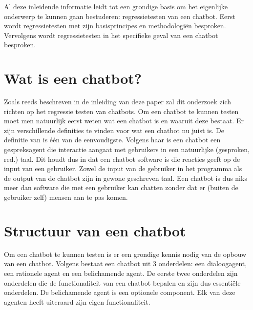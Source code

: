 Al deze inleidende informatie leidt tot een grondige basis om het eigenlijke onderwerp te kunnen gaan bestuderen: regressietesten van een chatbot. Eerst wordt regressietesten met zijn basisprincipes en methodologiën besproken. Vervolgens wordt regressietesten in het specifieke geval van een chatbot besproken.

\section{Wat is een chatbot?}

Zoals reeds beschreven in de inleiding van deze paper zal dit onderzoek zich richten op het regressie testen van chatbots. Om een chatbot te kunnen testen moet men natuurlijk eerst weten wat een chatbot is en waaruit deze bestaat. Er zijn verschillende definities te vinden voor wat een chatbot nu juist is. De definitie van \textcite{AbuShawar2015} is één van de eenvoudigste. Volgens haar is een chatbot een gespreksagent die interactie aangaat met gebruikers in een natuurlijke (gesproken, red.) taal. Dit houdt dus in dat een chatbot software is die reacties geeft op de input van een gebruiker. Zowel de input van de gebruiker in het programma als de output van de chatbot zijn in gewone geschreven taal. Een chatbot is dus niks meer dan software die met een gebruiker kan chatten zonder dat er (buiten de gebruiker zelf) mensen aan te pas komen. 

\section{Structuur van een chatbot}

Om een chatbot te kunnen testen is er een grondige kennis nodig van de opbouw van een chatbot. Volgens \textcite{Cahn2017} bestaat een chatbot uit 3 onderdelen: een dialoogagent, een rationele agent en een belichamende agent. De eerste twee onderdelen zijn onderdelen die de functionaliteit van een chatbot bepalen en zijn dus essentiële onderdelen. De belichamende agent is een optionele component. Elk van deze agenten heeft uiteraard zijn eigen functionaliteit. 

